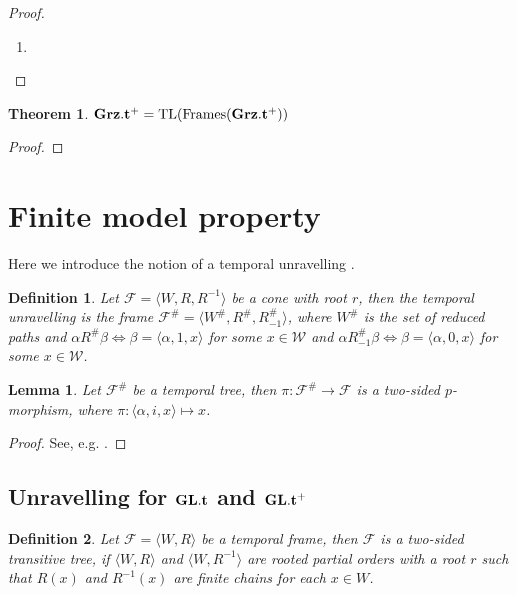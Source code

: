 \documentclass[a4paper]{article}
\theoremstyle{defin}
\newtheorem{defin}{Definition}
\theoremstyle{theorem}
\newtheorem{theorem}{Theorem}
\theoremstyle{prop}
\theoremstyle{lemma}
\newtheorem{lemma}{Lemma}
\theoremstyle{ex}
\theoremstyle{col}
\begin{document}
\begin{proof}
  $ $

\begin{enumerate}
  \item
  \end{enumerate}
\end{proof}

\begin{theorem}
  ${\bf Grz}.{\bf t}^{+} = \operatorname{TL}(\operatorname{Frames}({\bf Grz}.{\bf t}^{+}))$
\end{theorem}

\begin{proof}
\end{proof}

\section{Finite model property}

Here we introduce the notion of a temporal unravelling \cite{Shehtman14}.

\begin{defin}
  Let $\mathcal{F} = \langle W, R, R^{-1} \rangle$ be a cone with root $r$, then the temporal unravelling is the frame
  $\mathcal{F}^{\#} = \langle W^{\#}, R^{\#}, R_{-1}^{\#} \rangle$, where $W^{\#}$ is the set of reduced paths and
  $\alpha R^{\#} \beta \Leftrightarrow \beta = \langle \alpha, 1, x \rangle$ for some $x \in \mathcal{W}$ and
  $\alpha R_{-1}^{\#} \beta \Leftrightarrow \beta = \langle \alpha, 0, x \rangle$ for some $x \in \mathcal{W}$.
\end{defin}

\begin{lemma} Let $\mathcal{F}^{\#}$ be a temporal tree, then $\pi : \mathcal{F}^{\#} \to \mathcal{F}$ is a two-sided $p$-morphism, where
  $\pi : \langle \alpha, i, x \rangle \mapsto x$.
\end{lemma}

\begin{proof}
  See, e.g. \cite{Shehtman14}.
\end{proof}

\subsection{Unravelling for ${\bf GL}.{\bf t}$ and ${\bf GL}.{\bf t}^{+}$}

\begin{defin} Let $\mathcal{F} = \langle W, R \rangle$ be a temporal frame, then $\mathcal{F}$ is a two-sided transitive tree, if $\langle W, R \rangle$ and $\langle W, R^{-1} \rangle$ are rooted partial orders with a root $r$ such that $R(x)$ and $R^{-1}(x)$ are finite chains for each $x \in W$.
\end{defin}
\end{document}
